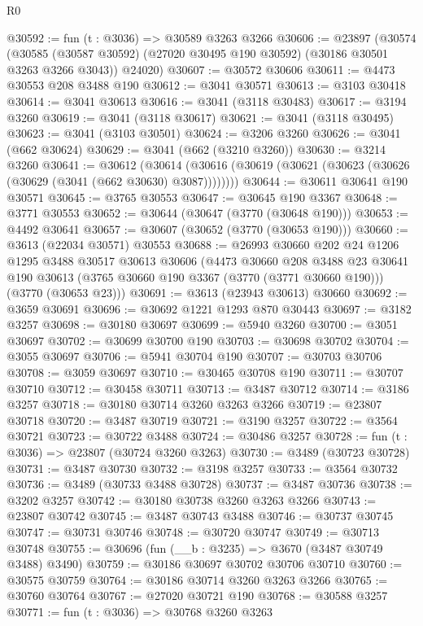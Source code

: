 \begin{lexlean}{R0}
\begin{coremodule}
@30592 := fun (t : @3036) => @30589 @3263 @3266
@30606 := @23897
    (@30574
      (@30585 (@30587 @30592) (@27020 @30495 @190 @30592) (@30186 @30501 @3263 @3266 @3043))
      @24020)
@30607 := @30572 @30606
@30611 := @4473 @30553 @208 @3488 @190
@30612 := @3041 @30571
@30613 := @3103 @30418
@30614 := @3041 @30613
@30616 := @3041 (@3118 @30483)
@30617 := @3194 @3260
@30619 := @3041 (@3118 @30617)
@30621 := @3041 (@3118 @30495)
@30623 := @3041 (@3103 @30501)
@30624 := @3206 @3260
@30626 := @3041 (@662 @30624)
@30629 := @3041 (@662 (@3210 @3260))
@30630 := @3214 @3260
@30641 := @30612
    (@30614 (@30616 (@30619 (@30621 (@30623 (@30626 (@30629 (@3041 (@662 @30630) @3087))))))))
@30644 := @30611 @30641 @190 @30571
@30645 := @3765 @30553
@30647 := @30645 @190 @3367
@30648 := @3771 @30553
@30652 := @30644 (@30647 (@3770 (@30648 @190)))
@30653 := @4492 @30641
@30657 := @30607 (@30652 (@3770 (@30653 @190)))
@30660 := @3613 (@22034 @30571) @30553
@30688 := @26993
    @30660
    @202
    @24
    @1206
    @1295
    @3488
    @30517
    @30613
    @30606
    (@4473
      @30660
      @208
      @3488
      @23
      @30641
      @190
      @30613
      (@3765 @30660 @190 @3367 (@3770 (@3771 @30660 @190)))
      (@3770 (@30653 @23)))
@30691 := @3613 (@23943 @30613) @30660
@30692 := @3659 @30691
@30696 := @30692 @1221 @1293 @870 @30443
@30697 := @3182 @3257
@30698 := @30180 @30697
@30699 := @5940 @3260
@30700 := @3051 @30697
@30702 := @30699 @30700 @190
@30703 := @30698 @30702
@30704 := @3055 @30697
@30706 := @5941 @30704 @190
@30707 := @30703 @30706
@30708 := @3059 @30697
@30710 := @30465 @30708 @190
@30711 := @30707 @30710
@30712 := @30458 @30711
@30713 := @3487 @30712
@30714 := @3186 @3257
@30718 := @30180 @30714 @3260 @3263 @3266
@30719 := @23807 @30718
@30720 := @3487 @30719
@30721 := @3190 @3257
@30722 := @3564 @30721
@30723 := @30722 @3488
@30724 := @30486 @3257
@30728 := fun (t : @3036) => @23807 (@30724 @3260 @3263)
@30730 := @3489 (@30723 @30728)
@30731 := @3487 @30730
@30732 := @3198 @3257
@30733 := @3564 @30732
@30736 := @3489 (@30733 @3488 @30728)
@30737 := @3487 @30736
@30738 := @3202 @3257
@30742 := @30180 @30738 @3260 @3263 @3266
@30743 := @23807 @30742
@30745 := @3487 @30743 @3488
@30746 := @30737 @30745
@30747 := @30731 @30746
@30748 := @30720 @30747
@30749 := @30713 @30748
@30755 := @30696 (fun (__b : @3235) => @3670 (@3487 @30749 @3488) @3490)
@30759 := @30186 @30697 @30702 @30706 @30710
@30760 := @30575 @30759
@30764 := @30186 @30714 @3260 @3263 @3266
@30765 := @30760 @30764
@30767 := @27020 @30721 @190
@30768 := @30588 @3257
@30771 := fun (t : @3036) => @30768 @3260 @3263

\end{coremodule}
\end{lexlean}
